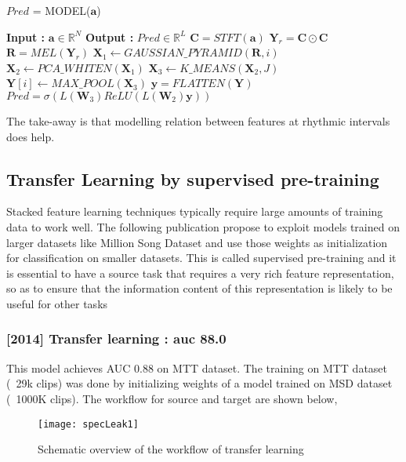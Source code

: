 \begin{algorithm}
  \caption{$Pred$ = MODEL($\textbf{a}$) }\label{Temporal Pooling}
  \begin{algorithmic}[1]
    \Statex \textbf{Input :} $\textbf{a} \in \mathbb{R}^{N}$
    \Statex \textbf{Output :} $Pred \in \mathbb{R}^{L}$ 
    \State $\textbf{C} = STFT(\textbf{a})$ 
    \State $\textbf{Y}_{r} = \textbf{C} \odot \textbf{C}$ 
    \State $\textbf{R} = MEL(\textbf{Y}_{r})$ 
     \State $\textbf{X}_{1} \leftarrow GAUSSIAN\_PYRAMID(\textbf{R},i)$ 
    \State $\textbf{X}_{2} \leftarrow PCA\_WHITEN(\textbf{X}_{1})$ 
     \State $\textbf{X}_{3} \leftarrow K\_MEANS(\textbf{X}_{2},J)$ 
    \State $\textbf{Y}[i] \leftarrow MAX\_POOL(\textbf{X}_{3})$ 
    \EndFor
    \State $\textbf{y} = FLATTEN(\textbf{Y})$ 
    \State $Pred = \sigma(L(\textbf{W}_{3})ReLU(L(\textbf{W}_{2})\textbf{y}))$ 
  \end{algorithmic}
\end{algorithm}
\noindent The take-away is that modelling relation between features at rhythmic intervals does help.

\subsection{Transfer Learning by supervised pre-training}
Stacked feature learning techniques  typically require large amounts of training data to work well. The following publication propose to exploit models trained on larger datasets like Million Song Dataset and use those weights as initialization for classification on smaller datasets. This is called supervised pre-training and it is essential to have a source task that requires a very rich feature representation, so as to ensure that the information content of this representation is likely to be useful for other tasks

\subsubsection{[2014] Transfer learning : auc 88.0}
This model achieves AUC 0.88 on MTT dataset. The training on MTT dataset (~29k clips) was done by initializing weights of a model trained on MSD dataset (~1000K clips). The workflow for source and target are shown below,
\begin{figure}[h] 
\centering
\texttt{[image: specLeak1]}
\caption{Schematic overview of the workflow of transfer learning}
 \label{fig:transfer learning}
 \end{figure}
\FloatBarrier
\bigskip

